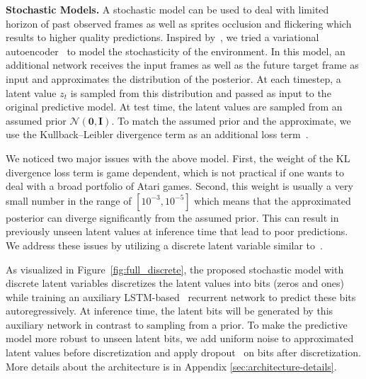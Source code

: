\textbf{Stochastic Models.}
A stochastic model can be used to deal with limited horizon of past observed frames as well as sprites occlusion and flickering which results to higher quality predictions. Inspired by~\citet{sv2p}, we tried a variational autoencoder~\citep{kingma2013auto} to model the stochasticity of the environment. In this model, an additional network receives the input frames as well as the future target frame as input and approximates the distribution of the posterior. At each timestep, a latent value $z_t$ is sampled from this distribution and passed as input to the original predictive model. At test time, the latent values are sampled from an assumed prior 
$\mathcal{N}(\mathbf{0}, \mathbf{I})$. 
To match the assumed prior and the approximate, we use the Kullback–Leibler divergence term as an additional loss term~\citep{sv2p}.

We noticed two major issues with the above model. First, the weight of the KL divergence loss term is game dependent, which is not practical if one wants to deal with a broad portfolio of Atari games. Second, this weight is usually a very small number in the range of $[10^{-3}, 10^{-5}]$ which means that the approximated posterior can diverge significantly from the assumed prior. This can result in previously unseen latent values at inference time that lead to poor predictions. We address these issues by utilizing a discrete latent variable similar to~\citet{auto_discrete}. 

As visualized in Figure~\ref{fig:full_discrete}, the proposed stochastic model with discrete latent variables discretizes the latent values into bits (zeros and ones) while training an auxiliary LSTM-based~\cite{hochreiter1997long} recurrent network to predict these bits autoregressively. At inference time, the latent bits will be generated by this auxiliary network in contrast to sampling from a prior. To make the predictive model more robust to unseen latent bits, we add uniform noise to approximated latent values before discretization and apply dropout~\citep{srivastava2014dropout} on bits after discretization. More details about the architecture is in Appendix \ref{sec:architecture-details}.


